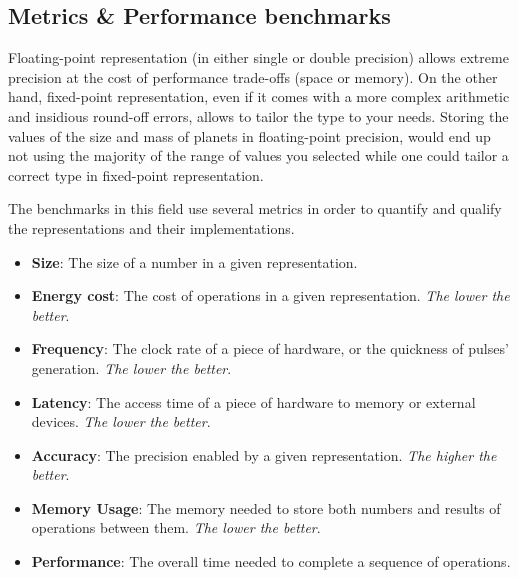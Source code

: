 
\subsection{Metrics \& Performance benchmarks}

Floating-point representation (in either single or double precision) allows extreme precision at the cost of performance trade-offs (space or memory). On the other hand, fixed-point representation, even if it comes with a more complex arithmetic and insidious round-off errors, allows to tailor the type to your needs. Storing the values of the size and mass of planets in floating-point precision, would end up not using the majority of the range of values you selected while one could tailor a correct type in fixed-point representation.

The benchmarks in this field use several metrics in order to quantify and qualify the representations and their implementations.
\begin{itemize}
	\item \textbf{Size}: The size of a number in a given representation.
	\item \textbf{Energy cost}: The cost of operations in a given representation. \emph{The lower the better}.
	\item \textbf{Frequency}: The clock rate of a piece of hardware, or the quickness of pulses' generation. \emph{The lower the better}.
	\item \textbf{Latency}: The access time of a piece of hardware to memory or external devices. \emph{The lower the better}.
	\item \textbf{Accuracy}: The precision enabled by a given representation. \emph{The higher the better}.
	\item \textbf{Memory Usage}: The memory needed to store both numbers and results of operations between them. \emph{The lower the better}.
	\item \textbf{Performance}: The overall time needed to complete a sequence of operations.
\end{itemize}

